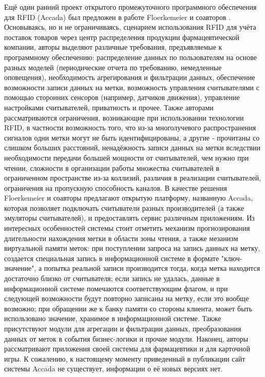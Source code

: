Ещё один ранний проект открытого промежуточного программного обеспечения для RFID (Accada) был предложен в работе Floerkemeier и соавторов \cite{Floerkemeier2007}. Основываясь, но и не ограничиваясь, сценарием использования RFID для учёта поставок товаров через центр распределения продукции фармацевтической компании, авторы выделяют различные требования, предъявляемые к программному обеспечению: распределение данных по пользователям на основе разных моделей (периодические отчета по требованию, немедленные оповещения), необходимость агрегирования и фильтрации данных, обеспечение возможности записи данных на метки, возможность управления считывателями с помощью сторонних сенсоров (например, датчиков движения), управление настройками считывателей, приватность и прочее. Также авторами рассматриваются ограничения, возникающие при использовании технологии RFID, в частности возможность того, что из-за многолучевого распространения сигналов одни метки могут не быть идентифицированы, а другие - прочитаны со слишком больших расстояний, ненадёжность записи данных на метки вследствии необходимости передачи большей мощности от считывателей, чем нужно при чтении, сложности в организации работы множества считывателей в ограниченном пространстве из-за коллизий, различия в реализации считывателей, ограничения на пропускную способность каналов. В качестве решения Floerkemeier и соавторы предлагают открытую платформу, названную Accada, которая позволяет подключать считыватели разных производителей (а также эмуляторы считывателей), и предоставлять сервис различным приложениям. Из интересных особенностей системы стоит отметить механизм прогнозирования длительности нахождения метки в области зоны чтения, а также мезанизм виртуальной памяти меток: при поступлении запроса на запись данных на метку, создается специальная запись в информационной системе в формате "ключ-значение", а попытка реальной записи производится тогда, когда метка находится достаточно близко от считывателя; если запись не удалась, данные в информационной системе помечаются соответствующим флагом, и при следующей возможности будут повторно записаны на метку, если это вообще возможно; при обращении же к банку памяти со стороны клиента, может быть использовано значение, хранимое в информационной системе. Также присутствуют модули для агрегации и фильтрации данных, преобразования данных от меток в события бизнес-логики и прочие модули. Наконец, авторы рассматривают приложения своей системы для фармацевтики и для карточной игры. К сожалению, к настоящему моменту приведенный в публикации сайт системы Accada не существует, информации о её новых версиях нет.

